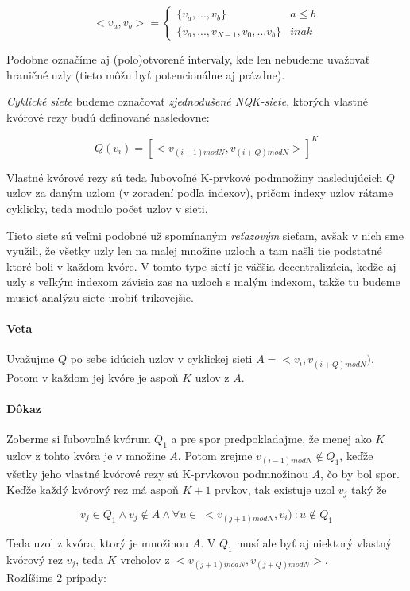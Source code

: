 $$<v_a, v_b> = \begin{cases}
                 \{v_a, ..., v_b\} & a\leq b \\
                 \{v_a, ...,v_{N-1}, v_0,... v_b\} & inak
               \end{cases}
$$

Podobne označíme aj (polo)otvorené intervaly, kde len nebudeme uvažovať
hraničné uzly (tieto môžu byť potencionálne aj prázdne).

\textit{Cyklické siete} budeme označovať \textit{zjednodušené NQK-siete},
ktorých vlastné kvórové rezy budú definované nasledovne:

$$Q(v_i)= [<v_{(i+1) mod N}, v_{(i+Q) mod N}>]^K$$

Vlastné kvórové rezy sú teda ľubovoľné K-prvkové podmnožiny nasledujúcich $Q$ uzlov
za daným uzlom (v zoradení podľa indexov),
pričom indexy uzlov rátame cyklicky, teda modulo počet uzlov v sieti.

Tieto siete sú veľmi podobné už spomínaným \textit{reťazovým} sieťam, avšak
v nich sme využili, že všetky uzly  len na malej množine uzloch
a tam našli tie podstatné ktoré boli v každom kvóre.
V tomto type sietí je väčšia decentralizácia, keďže aj uzly s veľkým indexom
závisia zas na uzloch s malým indexom, takže tu budeme musieť analýzu siete
urobiť trikovejšie.

\paragraph{Veta}
Uvažujme $Q$ po sebe idúcich uzlov v cyklickej sieti $A=<v_i, v_{(i+Q) mod N})$.
Potom v každom jej kvóre je aspoň $K$ uzlov z $A$.

\paragraph{Dôkaz}
Zoberme si ľubovoľné kvórum $Q_1$ a pre spor predpokladajme, že menej ako
$K$ uzlov z tohto kvóra je v množine $A$.
Potom zrejme $v_{(i-1) mod N}\notin Q_1$, keďže všetky jeho vlastné kvórové rezy
sú K-prvkovou podmnožinou $A$, čo by bol spor.
Keďže každý kvórový rez má aspoň $K+1$ prvkov, tak existuje uzol $v_j$ taký že

$$v_j\in Q_1\land v_j\notin A\land \forall u\in\: <v_{(j+1) mod N}, v_i)\: :u\notin Q_1$$

Teda  uzol z kvóra, ktorý je  množinou $A$.
V $Q_1$ musí ale byť aj niektorý vlastný kvórový rez $v_j$, teda $K$ vrcholov
z $<v_{(j+1)mod N}, v_{(j+Q) mod N}>$.\\
Rozlíšime 2 prípady:

